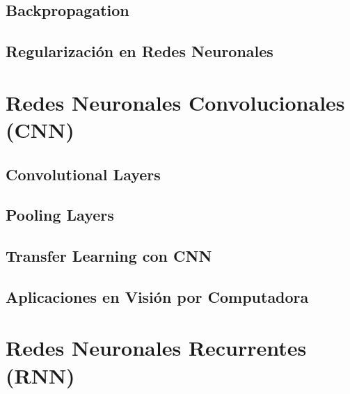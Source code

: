 \documentclass[12pt]{article}
\begin{document}
\subsection{Backpropagation}
\newpage
\subsection{Regularización en Redes Neuronales}
\newpage
\section{Redes Neuronales Convolucionales (CNN)}

\subsection{Convolutional Layers}
\newpage
\subsection{Pooling Layers}
\newpage
\subsection{Transfer Learning con CNN}
\newpage
\subsection{Aplicaciones en Visión por Computadora}
\newpage
\section{Redes Neuronales Recurrentes (RNN)}

\end{document}
